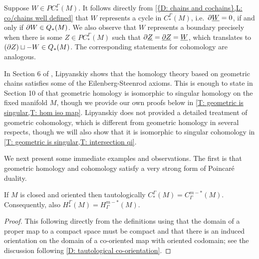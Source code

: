 \begin{comment}
	In Section 6 of \cite{Lipy14}, Lipyanskiy shows that the homology of $C_\Gamma^*(M)$, which we denote by $H_\Gamma^*(M)$,
	agrees with singular cohomology
	through the verification of homotopy and excision axioms.
	We find Mayer--Vietoris better for our applications, and we review both its verification
	and that of homotopy invariance as we need details about such constructions in our work.
\end{comment}

\begin{remark}\label{R: cycles and boundaries}
	Suppose $W \in PC_*^{\Gamma}(M)$.
	It follows directly from \cref{{D: chains and cochains},L: co/chains well defined} that $W$ represents a cycle in $C_*^{\Gamma}(M)$, i.e.\ $\partial \underline{W}=0$, if and only if $\partial W \in Q_*(M)$.
	We also observe that $W$ represents a boundary precisely when there is some $Z \in PC_*^\Gamma(M)$ such that $\partial \underline{Z} = \underline{\partial Z} = \underline{W}$, which translates to $(\partial Z) \sqcup -W \in Q_*(M)$.
	The corresponding statements for cohomology are analogous.
\end{remark}

In Section 6 of \cite{Lipy14}, Lipyanskiy shows that the homology theory based on geometric chains satisfies some of the Eilenberg-Steenrod axioms.
This is enough to state in Section 10 of \cite{Lipy14} that geometric homology is isomorphic to singular homology on the fixed manifold $M$, though we provide our own proofs below in \cref{T: geometric is singular,T: hom iso map}.
Lipyanskiy does not provided a detailed treatment of geometric cohomology, which is different from geometric homology in several respects, though we will also show that it is isomorphic to singular cohomology in \cref{T: geometric is singular,T: intersection qi}.

We next present some immediate examples and observations.
The first is that geometric homology and cohomology satisfy a very strong form of Poincar\'e duality.

\begin{theorem}\label{T: PD}
	If $M$ is closed and oriented then tautologically $C_*^\Gamma(M) = C_\Gamma^{m-*}(M)$.
	Consequently, also $H_*^\Gamma(M) = H_\Gamma^{m-*}(M)$.
\end{theorem}
\begin{proof}
	This following directly from the definitions using that the domain of a proper map to a compact space must be compact and that there is an induced orientation on the domain of a co-oriented map with oriented codomain; see the discussion following \cref{D: tautological co-orientation}.
\end{proof}



